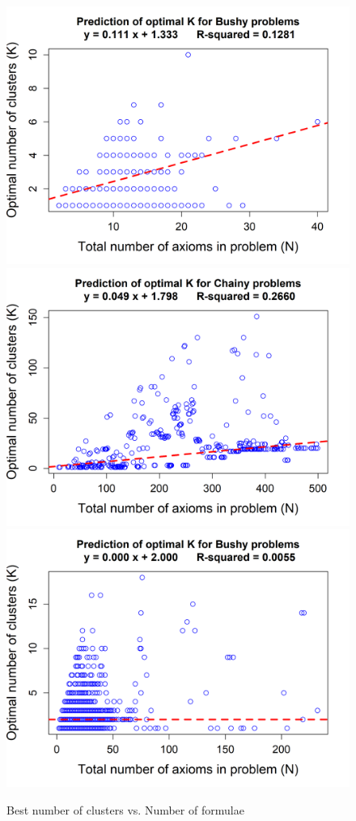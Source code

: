 \documentclass[]{ceurart}
\begin{document}
\begin{figure}
\centering
\includegraphics[scale=0.42]{median-regression-optimal-k-bushy-325.png}
\includegraphics[scale=0.42]{median-regression-optimal-k-chainy-325.png}\\
\includegraphics[scale=0.42]{median-regression-optimal-k-bushy-1551.png}
\caption{Best number of clusters vs. Number of formulae}
\label{fig:median-regression}
\end{figure}
\end{document}
